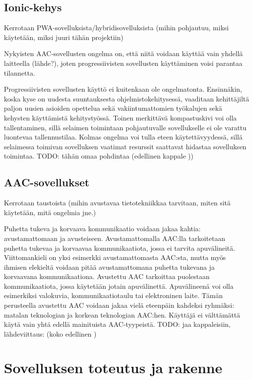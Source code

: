 \documentclass[utf8]{gradu3}
\begin{document}
\section{Ionic-kehys}

Kerrotaan PWA-sovelluksista/hybridisovelluksista (mihin pohjautuu, miksi käytetään, miksi juuri tähän projektiin)

Nykyisten AAC-sovellusten ongelma on, että niitä voidaan käyttää vain yhdellä laitteella (lähde?), joten progressiivisten sovellusten käyttäminen voisi parantaa tilannetta.

Progressiivisten sovellusten käyttö ei kuitenkaan ole ongelmatonta. Ensinnäkin, koska kyse on uudesta suuntauksesta ohjelmistokehitysessä, vaaditaan kehittäjiltä paljon uusien asioiden opettelua sekä vakiintumattomien työkalujen sekä kehysten käyttämistä kehitystyössä. Toinen merkittävä kompastuskivi voi olla tallentaminen, sillä selaimen toimintaan pohjautuvalle sovellukselle ei ole varattu luontevaa tallennustilaa. Kolmas ongelma voi tulla eteen käytettävyydessä, sillä selaimessa toimivan sovelluksen vaatimat resurssit saattavat hidastaa sovelluksen toimintaa. TODO: tähän omaa pohdintaa (edellinen kappale \parencite[]{pwa-design-challenges}))

\section{AAC-sovellukset}

Kerrotaan taustoista (mihin avustavaa tietotekniikkaa tarvitaan, miten sitä käytetään, mitä ongelmia jne.)

Puhetta tukeva ja korvaava kommunikaatio voidaan jakaa kahtia: avustamattomaan ja avusteiseen. Avustamattomalla AAC:lla tarkoitetaan puhetta tukevaa ja korvaavaa kommunikaatiota, jossa ei tarvita apuvälineitä. Viittomankieli on yksi esimerkki avustamattomasta AAC:sta, mutta myös ihmisen elekieltä voidaan pitää avustamattomana puhetta tukevana ja korvaavana kommunikaationa. Avustettu AAC tarkoittaa puolestaan kommunikaatiota, jossa käytetään jotain apuvälinettä. Apuvälineenä voi olla esimerkiksi valokuvia, kommunikaatiotaulu tai elektroninen laite. Tämän perusteella avustettu AAC voidaan jakaa vielä eteenpäin kahdeksi ryhmäksi: matalan teknologian ja korkean teknologian AAC:hen. Käyttäjä ei välttämättä käytä vain yhtä edellä mainituista AAC-tyypeistä.  TODO: jaa kappaleisiin, lähdeviittaus: (koko edellinen \parencite[]{AAC-conditional-use})

\chapter{Sovelluksen toteutus ja rakenne}
\end{document}
